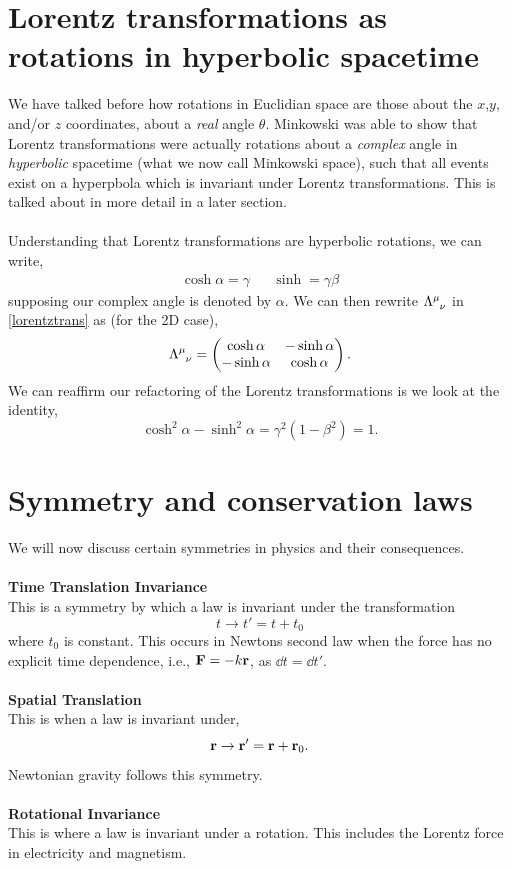 \documentclass{book}
\begin{document}
\section{Lorentz transformations as rotations in hyperbolic spacetime}
We have talked before how rotations in Euclidian space are those about the $x$,$y$, and/or $z$ coordinates, about a \textit{real} angle $\theta$. Minkowski was able to show that Lorentz transformations were actually rotations about a \textit{complex} angle in \textit{hyperbolic} spacetime (what we now call Minkowski space), such that all events exist on a hyperpbola which is invariant under Lorentz transformations. This is talked about in more detail in a later section.
\\\\
Understanding that Lorentz transformations are hyperbolic rotations, we can write,
\begin{align}
	\cosh\alpha = \gamma && \sinh = \gamma\beta
\end{align}
supposing our complex angle is denoted by $\alpha$. We can then rewrite $\Lambda\indices{^{\mu}_{\nu}}$ in \eqref{lorentztrans} as (for the 2D case),
\begin{equation}
	\Lambda\indices{^{\mu}_{\nu}} = \begin{pmatrix}
		\cosh\alpha & - \sinh\alpha \\
		-\sinh\alpha & \cosh\alpha
	\end{pmatrix}.
\end{equation}
We can reaffirm our refactoring of the Lorentz transformations is we look at the identity,
\begin{equation}
	\cosh^2\alpha - \sinh^2\alpha = \gamma^2\left(1 - \beta^2\right) = 1.
\end{equation}
\section{Symmetry and conservation laws}
We will now discuss certain symmetries in physics and their consequences.
\\\\
\textbf{Time Translation Invariance}\\
This is a symmetry by which a law is invariant under the transformation 
\begin{equation}
	t \to t' = t + t_0
\end{equation} where $t_0$ is constant. This occurs in Newtons second law when the force has no explicit time dependence, i.e., $\vb{F} = -k\vb{r}$, as $\dd{t} = \dd{t'}$.
\\\\
\textbf{Spatial Translation}\\
This is when a law is invariant under,
\begin{equation}
	\vb{r} \to \vb{r}' = \vb{r} + \vb{r}_0.
\end{equation}
Newtonian gravity follows this symmetry.
\\\\
\textbf{Rotational Invariance}\\
This is where a law is invariant under a rotation. This includes the Lorentz force in electricity and magnetism.
\end{document}
